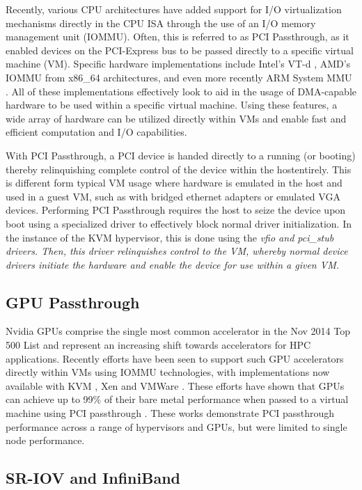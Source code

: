 \documentclass[times,10pt,twocolumn,conference]{IEEEtran}
\begin{document}
Recently, various CPU architectures have added support for I/O virtualization mechanisms directly in the CPU ISA through the use of an I/O memory management unit (IOMMU). Often, this is referred to as PCI Passthrough, as it enabled devices on the PCI-Express bus to be passed directly to a specific virtual machine (VM).  Specific hardware implementations include Intel's VT-d \cite{intel-vtd}, AMD's IOMMU \cite{amdiommu} from x86\_64 architectures, and even more recently ARM System MMU \cite{arm-systemmmu}.  All of these implementations effectively look to aid in the usage of DMA-capable hardware to be used within a specific virtual machine. Using these features, a wide array of hardware can be utilized directly within VMs and enable fast and efficient computation and I/O capabilities.

With PCI Passthrough, a PCI device is handed directly to a running (or booting) thereby relinquishing complete control of the device within the hostentirely. This is different form typical VM usage where hardware is emulated in the host and used in a guest VM, such as with bridged ethernet adapters or emulated VGA devices. Performing PCI Passthrough requires the host to seize the device upon boot using a specialized driver to effectively block normal driver initialization. In the instance of the KVM hypervisor, this is done using the \em{vfio} and \em{pci\_stub} drivers. Then, this driver relinquishes control to the VM, whereby normal device drivers initiate the hardware and enable the device for use within a given VM.  

\subsection{GPU Passthrough}

Nvidia GPUs comprise the single most common accelerator in the Nov 2014 Top 500 List \cite{top500} and represent an increasing shift towards accelerators for HPC applications. Recently efforts have been seen to support such GPU accelerators directly within VMs using IOMMU technologies, with implementations now available with KVM \cite{walters2014cloud}, Xen \cite{Younge2013hpgc} and VMWare \cite{Vu2014}.  These efforts have shown that GPUs can achieve up to 99\% of their bare metal performance when passed to a virtual machine using PCI passthrough \cite{Walters2014cloud}.  These works demonstrate PCI passthrough performance across a range of hypervisors and GPUs, but were limited to single node performance. 

\subsection{SR-IOV and InfiniBand}
\end{document}
